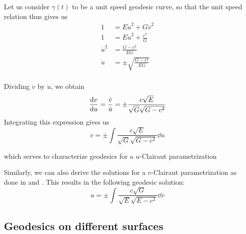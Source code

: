\documentclass[12pt]{article}
\begin{document}
Let us consider $\gamma(t)$ to be a unit speed geodesic curve, so that the unit speed relation thus gives us
\begin{align*}
    1 &= E \dot{u}^2 + G \dot{v}^2 \\
    1 &= E \dot{u}^2 + \frac{c^2}{G} \\
    \dot{u}^2 &= \frac{G - c^2}{EG} \\
    \dot{u} &= \pm \sqrt{\frac{G - c^2}{EG}} \\
\end{align*}

Dividing $\dot{v}$ by $\dot{u}$, we obtain
\[
    \dv{v}{u} = \frac{\dot{v}}{\dot{u}} = \pm \frac{c\sqrt{E}}{\sqrt{G}\sqrt{G - c^{2}}} 
\]
Integrating this expression gives us
\begin{equation} \label{eq:v_Clairaut_integral}
    v = \pm \int \frac{c\sqrt{E}}{\sqrt{G}\sqrt{G - c^{2}}} \dd{u}
\end{equation}

which serves to characterize geodesics for a $u$-Clairaut parametrization

Similarly, we can also derive the solutions for a $v$-Clairaut parametrization as done in \cite{oprea2007differential} and \cite{rigatti2023characterizing}.
This results in the following geodesic solution:
\begin{equation} \label{eq:u_Clairaut_integral}
	u = \pm \int \frac{c\sqrt{G}}{\sqrt{E}\sqrt{E - c^{2}}} \dd{v}
\end{equation}


\subsection{Geodesics on different surfaces}
\end{document}
